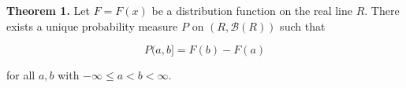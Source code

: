 \textbf{Theorem 1.} Let $F = F(x)$ be a distribution function on the real line $R$. There exists a unique probability measure $P$ on $(R, \mathcal{B}(R))$ such that

$$P(a, b] = F(b) - F(a)$$

for all $a, b$ with $-\infty \leq a < b < \infty$.
